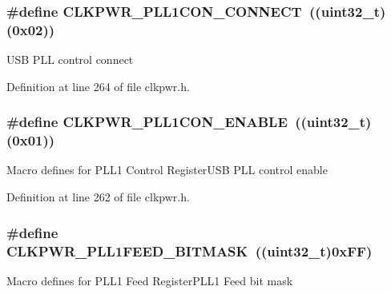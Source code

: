 \subsubsection[{\texorpdfstring{C\+L\+K\+P\+W\+R\+\_\+\+P\+L\+L1\+C\+O\+N\+\_\+\+C\+O\+N\+N\+E\+CT}{CLKPWR_PLL1CON_CONNECT}}]{\setlength{\rightskip}{0pt plus 5cm}\#define C\+L\+K\+P\+W\+R\+\_\+\+P\+L\+L1\+C\+O\+N\+\_\+\+C\+O\+N\+N\+E\+CT~(({\bf uint32\+\_\+t})(0x02))}\hypertarget{group___c_l_k_p_w_r___private___macros_ga37e9702988d0c7d33058372f9e679a73}{}\label{group___c_l_k_p_w_r___private___macros_ga37e9702988d0c7d33058372f9e679a73}
U\+SB P\+LL control connect 

Definition at line 264 of file clkpwr.\+h.

\subsubsection[{\texorpdfstring{C\+L\+K\+P\+W\+R\+\_\+\+P\+L\+L1\+C\+O\+N\+\_\+\+E\+N\+A\+B\+LE}{CLKPWR_PLL1CON_ENABLE}}]{\setlength{\rightskip}{0pt plus 5cm}\#define C\+L\+K\+P\+W\+R\+\_\+\+P\+L\+L1\+C\+O\+N\+\_\+\+E\+N\+A\+B\+LE~(({\bf uint32\+\_\+t})(0x01))}\hypertarget{group___c_l_k_p_w_r___private___macros_ga887a9ce77348290efc9e3a7e97b1d2d5}{}\label{group___c_l_k_p_w_r___private___macros_ga887a9ce77348290efc9e3a7e97b1d2d5}
Macro defines for P\+L\+L1 Control Register\+U\+SB P\+LL control enable 

Definition at line 262 of file clkpwr.\+h.

\subsubsection[{\texorpdfstring{C\+L\+K\+P\+W\+R\+\_\+\+P\+L\+L1\+F\+E\+E\+D\+\_\+\+B\+I\+T\+M\+A\+SK}{CLKPWR_PLL1FEED_BITMASK}}]{\setlength{\rightskip}{0pt plus 5cm}\#define C\+L\+K\+P\+W\+R\+\_\+\+P\+L\+L1\+F\+E\+E\+D\+\_\+\+B\+I\+T\+M\+A\+SK~(({\bf uint32\+\_\+t})0x\+F\+F)}\hypertarget{group___c_l_k_p_w_r___private___macros_ga9a447d2223491de7202909fc868cf488}{}\label{group___c_l_k_p_w_r___private___macros_ga9a447d2223491de7202909fc868cf488}
Macro defines for P\+L\+L1 Feed Register\+P\+L\+L1 Feed bit mask 

